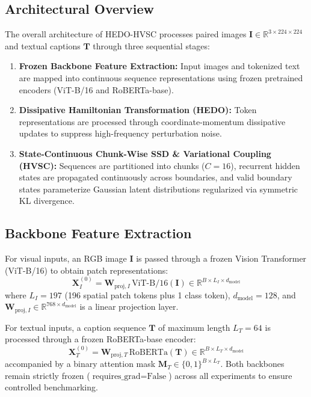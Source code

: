 \documentclass[11pt,journal,onecolumn,draftcls]{IEEEtran}
\begin{document}
\subsection{Architectural Overview}
The overall architecture of HEDO-HVSC processes paired images $\mathbf{I} \in \mathbb{R}^{3 \times 224 \times 224}$ and textual captions $\mathbf{T}$ through three sequential stages:
\begin{enumerate}
    \item \textbf{Frozen Backbone Feature Extraction:} Input images and tokenized text are mapped into continuous sequence representations using frozen pretrained encoders (ViT-B/16 and RoBERTa-base).
    \item \textbf{Dissipative Hamiltonian Transformation (HEDO):} Token representations are processed through coordinate-momentum dissipative updates to suppress high-frequency perturbation noise.
    \item \textbf{State-Continuous Chunk-Wise SSD \& Variational Coupling (HVSC):} Sequences are partitioned into chunks ($C=16$), recurrent hidden states are propagated continuously across boundaries, and valid boundary states parameterize Gaussian latent distributions regularized via symmetric KL divergence.
\end{enumerate}

\subsection{Backbone Feature Extraction}
For visual inputs, an RGB image $\mathbf{I}$ is passed through a frozen Vision Transformer (ViT-B/16) to obtain patch representations:
\begin{equation}
\mathbf{X}_I^{(0)} = \mathbf{W}_{\text{proj}, I} \, \text{ViT-B/16}(\mathbf{I}) \in \mathbb{R}^{B \times L_I \times d_{\text{model}}}
\end{equation}
where $L_I = 197$ (196 spatial patch tokens plus 1 class token), $d_{\text{model}} = 128$, and $\mathbf{W}_{\text{proj}, I} \in \mathbb{R}^{768 \times d_{\text{model}}}$ is a linear projection layer.

For textual inputs, a caption sequence $\mathbf{T}$ of maximum length $L_T = 64$ is processed through a frozen RoBERTa-base encoder:
\begin{equation}
\mathbf{X}_T^{(0)} = \mathbf{W}_{\text{proj}, T} \, \text{RoBERTa}(\mathbf{T}) \in \mathbb{R}^{B \times L_T \times d_{\text{model}}}
\end{equation}
accompanied by a binary attention mask $\mathbf{M}_T \in \{0, 1\}^{B \times L_T}$. Both backbones remain strictly frozen ($\text{requires\_grad} = \text{False}$) across all experiments to ensure controlled benchmarking.
\end{document}
